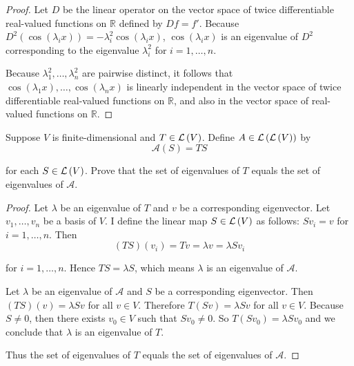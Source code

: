 \begin{proof}
    Let $D$ be the linear operator on the vector space of twice differentiable real-valued functions on $\mathbb{R}$ defined by $Df = f'$. Because $D^{2}(\cos(\lambda_{i}x)) = -\lambda_{i}^{2}\cos(\lambda_{i}x)$, $\cos(\lambda_{i}x)$ is an eigenvalue of $D^{2}$ corresponding to the eigenvalue $\lambda_{i}^{2}$ for $i = 1, \ldots, n$.

    Because $\lambda_{1}^{2}, \ldots, \lambda_{n}^{2}$ are pairwise distinct, it follows that $\cos{(\lambda_{1}x)} , \ldots, \cos{(\lambda_{n}x)}$ is linearly independent in the vector space of twice differentiable real-valued functions on $\mathbb{R}$, and also in the vector space of real-valued functions on $\mathbb{R}$.
\end{proof}
\newpage

\begin{exercise}
    Suppose $V$ is finite-dimensional and $T \in \mathcal{L}\left({V}\right)$. Define $A \in \mathcal{L}\left({\mathcal{L}\left({V}\right)}\right)$ by
    \[
        \mathcal{A}(S) = TS
    \]

    for each $S\in\mathcal{L}\left({V}\right)$. Prove that the set of eigenvalues of $T$ equals the set of eigenvalues of $\mathcal{A}$.
\end{exercise}

\begin{proof}
    Let $\lambda$ be an eigenvalue of $T$ and $v$ be a corresponding eigenvector. Let $v_{1}, \ldots, v_{n}$ be a basis of $V$. I define the linear map $S\in\mathcal{L}\left({V}\right)$ as follows: $Sv_{i} = v$ for $i = 1, \ldots, n$. Then
    \[
        (TS)(v_{i}) = Tv = \lambda v = \lambda Sv_{i}
    \]

    for $i = 1, \ldots, n$. Hence $TS = \lambda S$, which means $\lambda$ is an eigenvalue of $\mathcal{A}$.

    \bigskip
    Let $\lambda$ be an eigenvalue of $\mathcal{A}$ and $S$ be a corresponding eigenvector. Then $(TS)(v) = \lambda Sv$ for all $v\in V$. Therefore $T(Sv) = \lambda Sv$ for all $v\in V$. Because $S\ne 0$, then there exists $v_{0}\in V$ such that $Sv_{0}\ne 0$. So $T(Sv_{0}) = \lambda Sv_{0}$ and we conclude that $\lambda$ is an eigenvalue of $T$.

    Thus the set of eigenvalues of $T$ equals the set of eigenvalues of $\mathcal{A}$.
\end{proof}
\newpage


